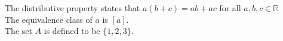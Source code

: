 \documentclass[18px]{article}
\begin{document}
The distributive property states that $a(b+c)=ab+ac$ for all $a,b,c \in \mathbb{R}$\\[6pt]
The equivalence class of $a$ is $[a]$.\\[6pt]
The set $A$ is defined to be $\{1,2,3\}$.
\end{document}
